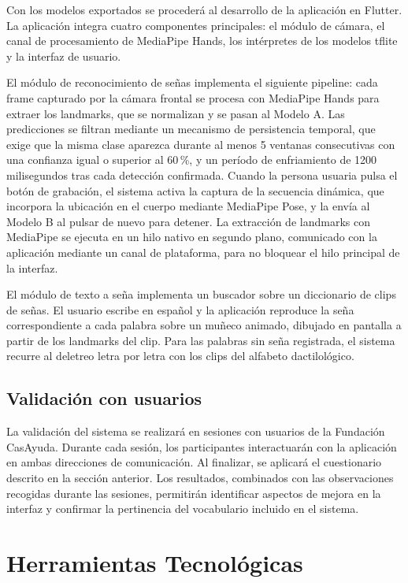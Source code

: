 Con los modelos exportados se procederá al desarrollo de la aplicación en Flutter. La
aplicación integra cuatro componentes principales: el módulo de cámara, el canal de
procesamiento de MediaPipe Hands, los intérpretes de los modelos \acrshort{tflite} y la
interfaz de usuario.

El módulo de reconocimiento de señas implementa el siguiente pipeline: cada frame
capturado por la cámara frontal se procesa con MediaPipe Hands para extraer los
landmarks, que se normalizan y se pasan al Modelo A. Las predicciones se filtran
mediante un mecanismo de persistencia temporal, que exige que la misma clase aparezca
durante al menos 5 ventanas consecutivas con una confianza igual o superior al 60\,\%,
y un período de enfriamiento de 1200 milisegundos tras cada detección confirmada. Cuando
la persona usuaria pulsa el botón de grabación, el sistema activa la captura de la
secuencia dinámica, que incorpora la ubicación en el cuerpo mediante MediaPipe Pose, y la
envía al Modelo B al pulsar de nuevo para detener. La extracción de landmarks con
MediaPipe se ejecuta en un hilo nativo en segundo plano, comunicado con la aplicación
mediante un canal de plataforma, para no bloquear el hilo principal de la interfaz.

El módulo de texto a seña implementa un buscador sobre un diccionario de clips de señas.
El usuario escribe en español y la aplicación reproduce la seña correspondiente a cada
palabra sobre un muñeco animado, dibujado en pantalla a partir de los landmarks del clip.
Para las palabras sin seña registrada, el sistema recurre al deletreo letra por letra con
los clips del alfabeto dactilológico.

\subsection{Validación con usuarios}

La validación del sistema se realizará en sesiones con usuarios de la Fundación CasAyuda.
Durante cada sesión, los participantes interactuarán con la
aplicación en ambas direcciones de comunicación. Al finalizar, se aplicará el
cuestionario descrito en la sección anterior. Los resultados, combinados con las
observaciones recogidas durante las sesiones, permitirán identificar aspectos de mejora
en la interfaz y confirmar la pertinencia del vocabulario incluido en el sistema.

\section{Herramientas Tecnológicas}

